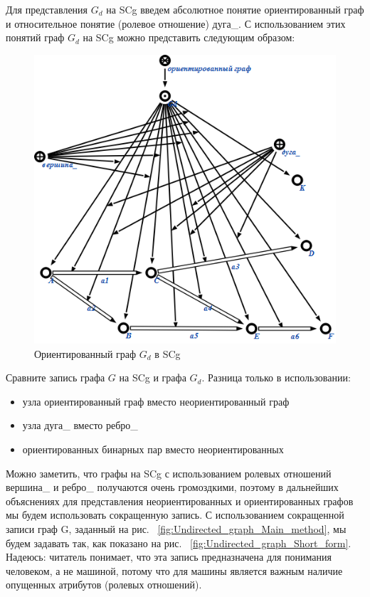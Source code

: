 Для представления $G_d$ на SCg введем абсолютное понятие ориентированный
граф и относительное понятие (ролевое отношение) дуга\_. С
использованием этих понятий граф $G_d$ на SCg можно представить
следующим образом:

\begin{figure}[h]
  \centering
  \includegraphics[scale=0.6]{images/2/Directed_graph}
  \caption{Ориентированный граф $G_d$ в SCg}
  \label{fig:Directed_graph}
\end{figure}

Сравните запись графа $G$ на SCg и графа $G_d$. Разница только в
использовании:

\begin{itemize}
\item узла ориентированный граф вместо неориентированный граф
\item узла дуга\_ вместо ребро\_
\item ориентированных бинарных пар вместо неориентированных
\end{itemize}

Можно заметить, что графы на SCg с использованием ролевых отношений
вершина\_ и ребро\_ получаются очень громоздкими, поэтому в дальнейших
объяснениях для представления неориентированных и ориентированных
графов мы будем использовать сокращенную запись. С использованием
сокращенной записи граф G, заданный на рис.
~\ref{fig:Undirected_graph_Main_method}, мы будем задавать так, как
показано на рис. ~\ref{fig:Undirected_graph_Short_form}. Надеюсь:
читатель понимает, что эта запись предназначена для понимания
человеком, а не машиной, потому что для машины является важным наличие
опущенных атрибутов (ролевых отношений).

